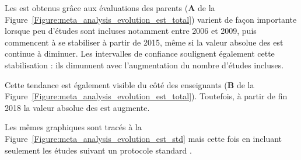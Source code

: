 Les \gls{est} obtenus grâce aux évaluations des parents (\textbf{A} de la Figure~\ref{Figure:meta_analysis_evolution_est_total}) varient de façon 
importante lorsque peu d'études sont incluses notamment entre 2006 et 2009, puis commencent à se stabiliser à 
partir de 2015, même si la valeur absolue des \gls{est} continue à diminuer. Les intervalles de confiance soulignent également cette stabilisation : ils dimunuent 
avec l'augmentation du nombre d'études incluses. 

Cette tendance est également visible du côté des enseignants (\textbf{B} de la Figure~\ref{Figure:meta_analysis_evolution_est_total}). Toutefois, à partir 
de fin 2018 la valeur absolue des \gls{est} augmente.

Les mêmes graphiques sont tracés à la Figure~\ref{Figure:meta_analysis_evolution_est_std} mais cette fois en incluant seulement 
les études suivant un protocole standard \citep{Arns2014}.

